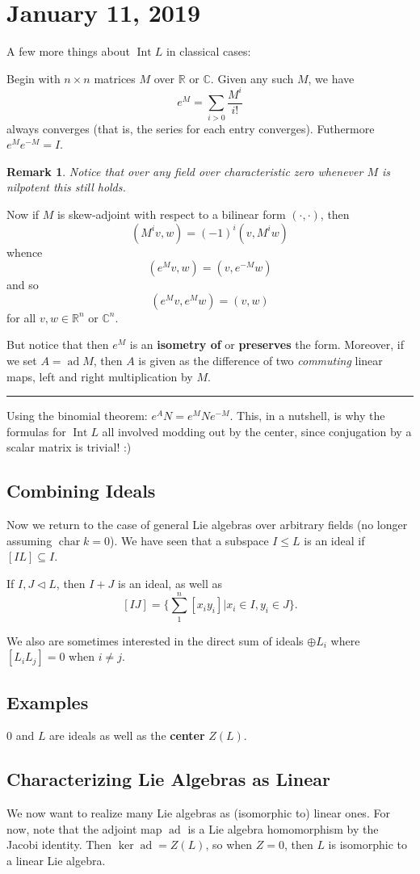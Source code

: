 \documentclass[12pt]{article}
\theoremstyle{nonumberbreak}
\theoremstyle{changebreak}
\theoremstyle{nonumberbreak}
\theoremstyle{change}
\newtheorem{rmk}[thm]{Remark}
\newcommand*{\R}{
\mathbb{R}
}
\newcommand*{\C}{
\mathbb{C}
}
\newcommand*{\brk}{
\rule{2in}{.1pt}
}
\DeclareMathOperator{\ch}{char}
\DeclareMathOperator{\ad}{ad}
\DeclareMathOperator{\Int}{Int}
\begin{document}
\section{January 11, 2019}
A few more things about $\Int L$ in classical cases:

Begin with $n\times n$ matrices $M$ over $\R$ or $\C$. Given any such $M$, we have
\[e^M=\sum_{i>0}\frac{M^i}{i!}\]
always converges (that is, the series for each entry converges). Futhermore $e^Me^{-M}=I$.
\begin{rmk}
	Notice that over \textit{any} field over characteristic zero whenever $M$ is nilpotent 
	this still holds.
\end{rmk}

Now if $M$ is skew-adjoint with respect to a bilinear form $(\cdot,\cdot)$, then 
\[(M^iv,w)=(-1)^i(v,M^iw)\]
whence
\[(e^Mv, w)=(v,e^{-M}w)\]
and so 
\[(e^Mv,e^Mw)=(v,w)\]
for all $v,w\in\R^n$ or $\C^n$.

But notice that then $e^M$ is an \textbf{isometry of} or \textbf{preserves} the form. Moreover, 
if we set $A=\ad M$, then $A$ is given as the difference of two \textit{commuting} linear maps, 
left and right multiplication by $M$.

\brk

Using the binomial theorem: $e^AN=e^MNe^{-M}$. This, in a nutshell, is why the formulas for
$\Int L$ all involved modding out by the center, since conjugation by a scalar matrix is trivial! :)

\subsection{Combining Ideals}
Now we return to the case of general Lie algebras over arbitrary fields (no longer assuming $\ch k=0$). 
We have seen that a subspace $I\le L$ is an ideal if $[IL]\subseteq I$.

If $I,J\lhd L$, then $I+J$ is an ideal, as well as
\[[IJ]=\{\sum_1^n [x_iy_i]|x_i\in I, y_i\in J\}.\]

We also are sometimes interested in the direct sum of ideals $\oplus L_i$ where $[L_iL_j]=0$ when $i\ne j$.

\subsection{Examples}
$0$ and $L$ are ideals as well as the \textbf{center} $Z(L)$.

\subsection{Characterizing Lie Algebras as Linear}
We now want to realize many Lie algebras as (isomorphic to) linear ones. For now, note that the adjoint map $\ad$
is a Lie algebra homomorphism by the Jacobi identity. Then $\ker\ad=Z(L)$, so when $Z=0$, then $L$ is isomorphic to 
a linear Lie algebra. 
\end{document}
